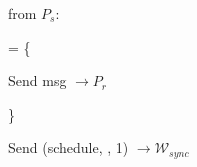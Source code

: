 \begin{bbox}[title={$\F_{\msf{off-chain-chan}}(P_s, P_r)$}]

\OnInput {} from $P_s$:
	\begin{renumerate}
			\item {} = \{
			
				\quad Send msg $\rightarrow P_r$

			\}
			\item Send (schedule, , 1) $\rightarrow \mathcal{W}_{sync}$
	\end{renumerate}

\end{bbox}
